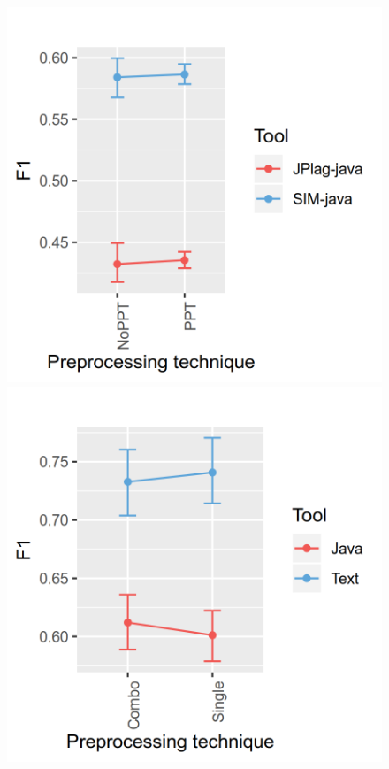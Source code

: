 \documentclass[a4paper, 12pt, oneside, openany, final, pdftex]{book}\usepackage[]{graphicx}\usepackage[]{color}
\makeatletter
\def\maxwidth{ %
  \ifdim\Gin@nat@width>\linewidth
    \linewidth
  \else
    \Gin@nat@width
  \fi
}
\makeatother
\begin{document}
\begin{appendices}
\begin{figure}[ht]
\label{fig:interaction- 4 for SOCO D1 }\endminipage\hfill {} 
\includegraphics[width=\maxwidth]{figure/Figure-SOCO-INTERACTION-5} 
\label{fig:interaction- 5 for SOCO D1 }\endminipage\hfill {} 
\includegraphics[width=\maxwidth]{figure/Figure-SOCO-INTERACTION-6} 

\end{figure}
\end{appendices}
\end{document}
